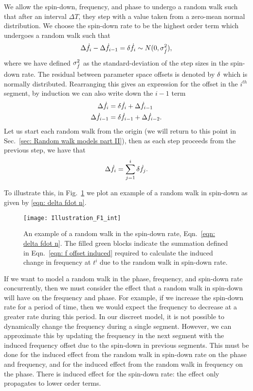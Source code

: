 We allow the spin-down, frequency, and phase to undergo a random walk such that
after an interval $\Delta T$, they step with a value taken from a zero-mean
normal distribution. We choose the spin-down rate to be the highest order term
which undergoes a random walk such that
\begin{equation}
\Delta \dot{f}_{i} - \Delta\dot{f}_{i-1} = \delta \dot{f}_{i} \sim N(0, \sigma_{\dot{f}}^{2}),
\end{equation}
where we have defined $\sigma_{\dot{f}}^{2}$ as the standard-deviation of the step sizes in
the spin-down rate. The residual between parameter space offsets is denoted by $\delta$
which is normally distributed. Rearranging this gives an expression for
the offset in the $i^{th}$ segment, by induction we can also write down the
$i-1$ term
\begin{align}
\Delta\dot{f}_{i} &  = \delta\dot{f}_{i} + \Delta\dot{f}_{i-1}  \\
\Delta\dot{f}_{i-1} &  = \delta\dot{f}_{i-1} + \Delta\dot{f}_{i-2}  .
\end{align}
Let us start each random walk from the origin (we will return to this point in 
Sec.~\ref{sec: Random walk models part II}), then
as each step proceeds from the previous step, we have that
\begin{equation} 
\Delta\dot{f}_{i} = \sum_{j=1}^{i}\delta\dot{f}_{j}.
\label{eqn: delta fdot n} 
\end{equation}

To illustrate this, in Fig.~\ref{fig: Illustration fdot int} we plot an example
of a random walk in spin-down as given by \eqref{eqn: delta fdot n}.
\begin{figure}[ht]
\centering
\texttt{[image: Illustration\_F1\_int]}
\caption{An example of a random walk in the spin-down rate, 
Eqn.~\eqref{eqn: delta fdot n}. The filled green blocks indicate the
summation defined in Eqn.~\eqref{eqn: f offset induced} required to
calculate the induced change in frequency at $t^{i}$ due to the random walk in
spin-down rate.}
\label{fig: Illustration fdot int}
\end{figure}

If we want to model a random walk in the phase, frequency, and spin-down rate
concurrently, then we must consider the effect that a
random walk in spin-down will have on the frequency and phase. For example, if we
increase the spin-down rate for a period of time, then we would expect the frequency
to decrease at a greater rate during this period. In our discreet model, it is
not possible to dynamically change the frequency during a single segment.
However, we can approximate this by updating the frequency in the next
segment with the induced frequency offset due to the spin-down in previous
segments. This must be done for the induced effect from the random walk in spin-down rate on
the phase and frequency, and for the induced effect from the random walk in frequency
on the phase. There is induced effect for the spin-down rate: the effect only
propagates to lower order terms.

